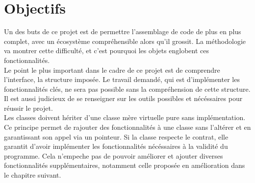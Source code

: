 \documentclass[9pts]{article}
\begin{document}
\pagebreak

\section{Objectifs}

Un des buts de ce projet est de permettre l'assemblage de code de plus en plus complet, avec un écosystème compréhensible alors qu'il grossit. La méthodologie va montrer cette difficulté, et
c'est pourquoi les objets englobent ces fonctionnalités. \\

Le point le plus important dans le cadre de ce projet est de comprendre l'interface, la structure imposée. Le travail demandé, qui est d'implémenter les fonctionnalités clés, ne sera pas possible sans la compréhension de cette structure. Il est aussi judicieux de se renseigner sur les outils possibles et nécéssaires pour réussir le projet.\\

Les classes doivent hériter d'une classe mère virtuelle pure sans implémentation. Ce principe permet de rajouter des fonctionnalités à une classe sans l'altérer et en garantissant son appel via un pointeur.
Si la classe respecte le contrat, elle garantit d'avoir implémenter les fonctionnalités nécéssaires à la validité du programme. Cela n'empeche pas de pouvoir améliorer et ajouter diverses fonctionnalités supplémentaires, notamment celle proposée en amélioration dans le chapitre suivant. \\
\end{document}
